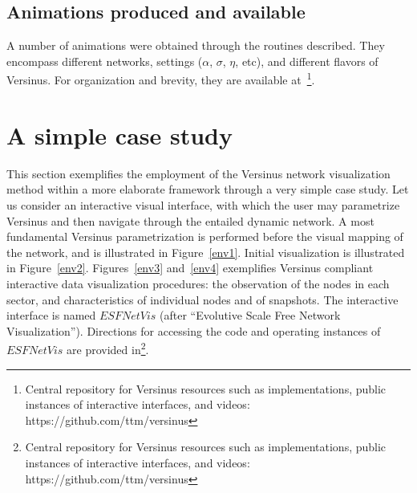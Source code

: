 \documentclass[runningheads]{llncs}
\begin{document}
\subsection{Animations produced and available}\label{sec:vid}
A number of animations were obtained through the routines described.
They encompass different networks, settings ($\alpha$, $\sigma$, $\eta$,
etc), and different flavors of Versinus.
For organization and brevity, they are available at~\footnote{Central repository for Versinus resources such as implementations, public instances of interactive interfaces, and videos: https://github.com/ttm/versinus}.

\section{A simple case study}\label{visAn}
This section exemplifies the employment of the Versinus network visualization method
within a more elaborate framework through a very simple case study.
Let us consider an interactive visual interface, with which the user may parametrize Versinus and then navigate through the entailed dynamic network.
A most fundamental Versinus parametrization is performed before the visual mapping of the network, and is illustrated in Figure~\ref{env1}.
Initial visualization is illustrated in Figure~\ref{env2}.
Figures~\ref{env3} and~\ref{env4} exemplifies Versinus compliant interactive data visualization procedures: the observation of the nodes in each sector, and characteristics of individual nodes and of snapshots.
The interactive interface is named $ESFNetVis$ (after ``Evolutive Scale Free Network Visualization'').
Directions for accessing the code and operating instances of $ESFNetVis$
are provided in\footnote{Central repository for Versinus resources such as implementations, public instances of interactive interfaces, and videos: https://github.com/ttm/versinus}.
\end{document}
